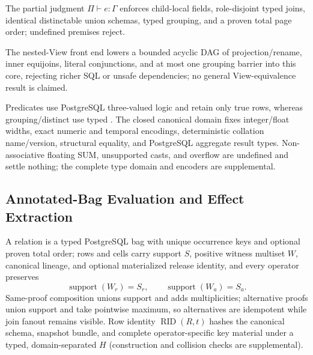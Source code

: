 \documentclass[10pt,journal,compsoc]{IEEEtran}
\newcommand{\code}[1]{\texttt{\detokenize{#1}}}
\begin{document}
The partial judgment $\Pi\vdash e:\Gamma$ enforces child-local fields,
role-disjoint typed joins, identical distinctable union schemas, typed
grouping, and a proven total page order; undefined premises reject.

The nested-View front end lowers a bounded acyclic DAG of projection/rename,
inner equijoins, literal conjunctions, and at most one grouping barrier into
this core, rejecting richer SQL or unsafe dependencies; no general
View-equivalence result is claimed.

Predicates use PostgreSQL three-valued logic and retain only true rows, whereas
grouping/distinct use typed \code{IS NOT DISTINCT FROM}. The closed canonical
domain fixes integer/float widths, exact numeric and temporal encodings,
deterministic collation name/version, \code{jsonb} structural equality, and
PostgreSQL aggregate result types. Non-associative
floating SUM, unsupported casts, and overflow are undefined and settle
nothing; the complete type domain and encoders are supplemental.

\subsection{Annotated-Bag Evaluation and Effect Extraction}

A relation is a typed PostgreSQL bag with unique occurrence keys and optional
proven total order; rows and cells carry support $S$, positive witness
multiset $W$, canonical lineage, and optional materialized release identity,
and every operator preserves
\begin{equation}
 \operatorname{support}(W_r)=S_r,\qquad
 \operatorname{support}(W_a)=S_a.                 \label{eq:anninv}
\end{equation}
Same-proof composition unions support and adds multiplicities; alternative
proofs union support and take pointwise maximum, so alternatives are
idempotent while join fanout remains visible. Row identity
$\operatorname{RID}(R,t)$ hashes the canonical schema, snapshot bundle, and
complete operator-specific key material under a typed, domain-separated
$H$ (construction and collision checks are supplemental).
\end{document}
